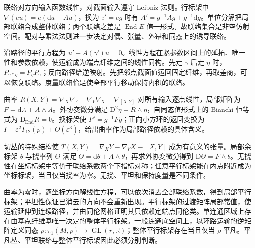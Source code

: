 \begin{chaptersummary}
	联络对方向输入函数线性，对截面输入遵守 Leibniz 法则。行标架中 \(\nabla(eu)=e(\mathrm{d}u+Au)\)，换为 \(e'=eg\) 时有 \(A'=g^{-1}Ag+g^{-1}\mathrm{d}g\)。单位分解把局部联络合成整体联络；两个联络之差是 \(\operatorname{End}E\) 值一形式，故联络集合是非空仿射空间。配对与乘法法则进一步决定对偶、张量、外幂和同态上的诱导联络。

	\ProseParagraphBreak

	沿路径的平行方程为 \(u'+A(\gamma')u=0\)。线性方程在紧参数区间上的延拓、唯一性和参数依赖，使运输成为端点纤维之间的线性同构。先走 \(\gamma\) 后走 \(\eta\) 时，\(P_{\gamma*\eta}=P_\eta P_\gamma\)；反向路径给逆映射。先把邻点截面值运回固定纤维，再取差商，可以恢复联络。度量联络恰是使全部平行移动保持内积的联络。

	\ProseParagraphBreak

	曲率 \(R(X,Y)=\nabla_X\nabla_Y-\nabla_Y\nabla_X-\nabla_{[X,Y]}\) 对所有输入逐点线性，局部矩阵为 \(F=\mathrm{d}A+A\wedge A\)。外协变微分满足 \(\mathrm{D}^2\eta=R\wedge\eta\)，自同态值形式上的 Bianchi 恒等式为 \(\mathrm{D}_{\operatorname{End}}R=0\)。换标架使 \(F'=g^{-1}Fg\)；正向小方环的返回变换为 \(I-\varepsilon^2F_{12}(p)+O(\varepsilon^3)\)，给出曲率作为局部路径依赖的具体含义。

	\ProseParagraphBreak

	切丛的特殊结构使 \(T(X,Y)=\nabla_XY-\nabla_YX-[X,Y]\) 成为有意义的张量。局部余标架 \(\theta\) 与挠率列 \(\Theta\) 满足 \(\Theta=\mathrm{d}\theta+A\wedge\theta\)，再求外协变微分得到 \(\mathrm{D}\Theta=F\wedge\theta\)。无挠性在坐标标架中等价于联络系数两个下指标对称；任意平行标架能在内点附近成为坐标标架，当且仅当挠率为零。无挠、平坦和保持度量是不同条件。

	\ProseParagraphBreak

	曲率为零时，逐坐标方向解线性方程，可以依次消去全部联络系数，得到局部平行标架；平坦性保证已消去的方向不会重新出现。平行标架的过渡矩阵局部常值，使运输延伸到连续路径，并由同伦网格证明其只依赖定端点同伦类。单连通区域上存在由基点纤维基唯一决定的整体平行标架。一般连通底空间上，以环路运输的逆矩阵定义同态 \(\rho:\pi_1(M,p)\to\operatorname{GL}(r,\mathbb R)\)；整体平行标架存在当且仅当 \(\rho\) 平凡。平凡丛、平坦联络与整体平行标架因此必须分别判断。
\end{chaptersummary}

\BookExercises

